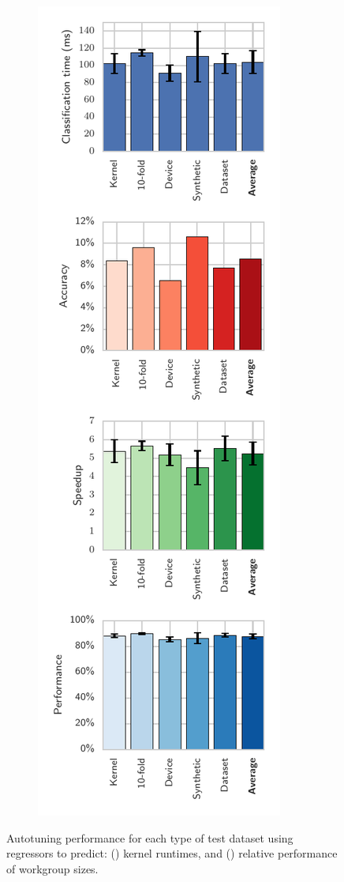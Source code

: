 \documentclass[preprint,nonatbib,10pt]{sigplanconf}
\begin{document}
\begin{figure}
\begin{subfigure}[h]{.48\columnwidth}
\caption{}
\label{fig:runtime-class-xval}
\end{subfigure}
\begin{subfigure}[h]{.48\columnwidth}
\centering
\includegraphics[width=\columnwidth]{img/speedup-class-xval}
\caption{}
\label{fig:speedup-class-xval}
\end{subfigure}
\caption{%
  Autotuning performance for each type of test dataset using
  regressors to predict: () kernel
  runtimes, and () relative performance
  of workgroup sizes.%
}
\label{fig:regression-class}
\end{figure}
\end{document}
